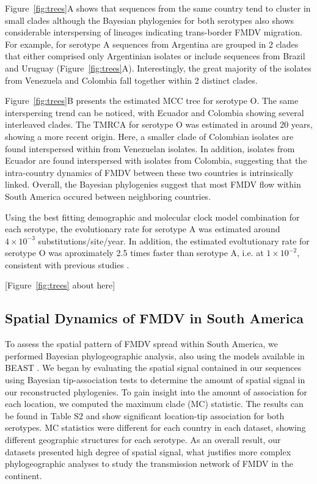\documentclass[10pt]{article}
\begin{document}
Figure~\ref{fig:trees}A shows that sequences from the same country tend to cluster in small clades although the Bayesian phylogenies for both serotypes also shows considerable interspersing of lineages indicating trans-border FMDV migration.
For example, for serotype A sequences from Argentina are grouped in 2 clades that either comprised only Argentinian isolates or include sequences from Brazil and Uruguay (Figure~\ref{fig:trees}A).
Interestingly, the great majority of the isolates from Venezuela and Colombia fall together within 2 distinct clades. 

Figure~\ref{fig:trees}B presents the estimated MCC tree for serotype O.
The same interspersing trend can be noticed, with Ecuador and Colombia showing several interleaved clades.
The TMRCA for serotype O was estimated in around 20 years, showing a more recent origin.
Here, a smaller clade of Colombian isolates are found interspersed within from Venezuelan isolates. In addition, isolates from Ecuador are found interspersed with isolates from Colombia, suggesting that the intra-country dynamics of FMDV between these two countries is intrinsically linked.
Overall, the Bayesian phylogenies suggest that most FMDV flow within South America occured between neighboring countries. 

Using the best fitting demographic and molecular clock model combination for each serotype, the evolutionary rate for serotype A was estimated around $4 \times 10^{-3}$ substitutions/site/year. In addition, the estimated evoltutionary rate for serotype O was aproximately 2.5 times faster than serotype A, i.e. at $1 \times 10^{-2}$, consistent with previous studies \cite{tully,Carvalho2012}. 

\begin{center}
 [Figure~\ref{fig:trees} about here]
\end{center}

\subsection*{Spatial Dynamics of FMDV in South America}

To assess the spatial pattern of FMDV spread within South America, we performed Bayesian phylogeographic analysis, also using the models available in BEAST \cite{roots}.
We began by evaluating the spatial signal contained in our sequences using Bayesian tip-association tests \cite{bats} to determine the amount of spatial signal in our reconstructed phylogenies.
To gain insight into the amount of association for each location, we computed the maximum clade (MC) statistic.
The results can be found in Table S2 and show significant location-tip association for both serotypes.
MC statistics were different for each country in each dataset, showing different geographic structures for each serotype.
As an overall result, our datasets presented high degree of spatial signal, what justifies more complex phylogeographic analyses to study the transmission network of FMDV in the continent.
\end{document}
